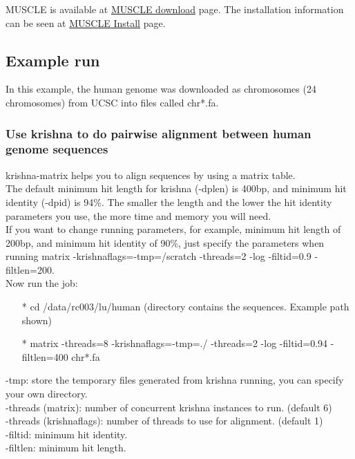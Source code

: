 \documentclass[12pt]{article}
\begin{document}
\noindent MUSCLE is available at \href{https://www.drive5.com/muscle/downloads.htm} {\color{blue}MUSCLE download} page.
\noindent The installation information can be seen at \href{https://www.drive5.com/muscle/manual/install.html} {\color{blue}MUSCLE Install} page.


\subsection{Example run}
In this example, the human genome was downloaded as chromosomes (24 chromosomes) from UCSC into files called chr*.fa.

\subsubsection{Use krishna to do pairwise alignment between human genome sequences}

krishna-matrix helps you to align sequences by using a matrix table. \\

\noindent The default minimum hit length for krishna (-dplen) is 400bp, and minimum hit identity (-dpid) is 94\%. The smaller the length and the lower the hit identity parameters you use, the more time and memory you will need. \\

\noindent If you want to change running parameters, for example, minimum hit length of 200bp, and minimum hit identity of 90\%, just specify the parameters when running matrix {\color{red}-krishnaflags=\textquotedbl-tmp=/scratch -threads=2 -log -filtid=0.9 -filtlen=200\textquotedbl}.\\

\noindent Now run the job:

\begin{enumerate}
	\item[*] cd /data/rc003/lu/human (directory contains the sequences. Example path shown)
	\item[*] matrix -threads=8 -krishnaflags=\textquotedbl-tmp=./ -threads=2 -log -filtid=0.94 -filtlen=400\textquotedbl{} chr*.fa
\end{enumerate}
-tmp: store the temporary files generated from krishna running, you can specify your own directory. \\
-threads (matrix): number of concurrent krishna instances to run. (default 6) \\
-threads (krishnaflags): number of threads to use for alignment. (default 1) \\
-filtid: minimum hit identity. \\
-filtlen: minimum hit length. \\
\end{document}
